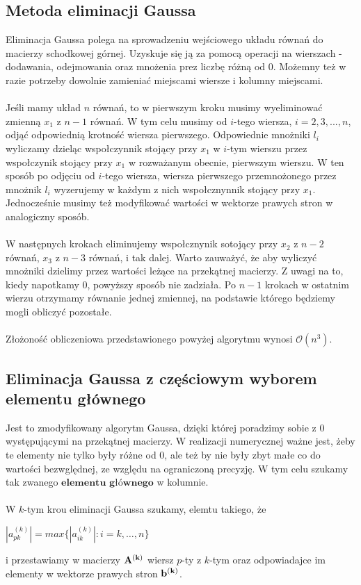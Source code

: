 \documentclass{article}
\begin{document}
\subsection{Metoda eliminacji Gaussa}
Eliminacja Gaussa polega na sprowadzeniu wejściowego układu równań do macierzy schodkowej górnej. Uzyskuje się ją za pomocą operacji na wierszach - dodawania, odejmowania oraz mnożenia prez  liczbę różną od 0. Możemny też w razie potrzeby dowolnie zamieniać miejscami wiersze i kolumny miejscami.
\\\\
Jeśli mamy układ $n$ równań, to w pierwszym kroku musimy wyeliminować zmienną $x_{1}$ z $n-1$ równań. W tym celu musimy od $i$-tego wiersza, $i = 2,3,...,n$, odjąć odpowiednią krotność wiersza pierwszego. Odpowiednie mnożniki $l_{i}$ wyliczamy dzieląc wspołczynnik stojący przy $x_{1}$ w $i$-tym wierszu przez wspołczynik stojący przy $x_{1}$ w rozważanym obecnie, pierwszym wierszu. W ten sposób po odjęciu od $i$-tego wiersza, wiersza pierwszego przemnożonego przez mnożnik $l_{i}$ wyzerujemy w każdym z nich wspołcznynnik stojący przy $x_{1}$. Jednocześnie musimy też modyfikować wartości w wektorze prawych stron w analogiczny sposób.
\\\\
W następnych krokach eliminujemy wspołcznynik sotojący przy $x_{2}$ z $n-2$ równań, $x_{3}$ z $n-3$ równań, i tak dalej. Warto zauważyć, że aby wyliczyć mnożniki dzielimy przez wartości leżące na przekątnej macierzy. Z uwagi na to, kiedy napotkamy 0, powyższy sposób nie zadziała. Po $n-1$ krokach w ostatnim wierzu otrzymamy równanie jednej zmiennej, na podstawie którego będziemy mogli obliczyć pozostałe.
\\\\
Złożoność obliczeniowa przedstawionego powyżej algorytmu wynosi $\mathcal{O}(n^{3})$.

\subsection{Eliminacja Gaussa z częściowym wyborem elementu głównego}
Jest to zmodyfikowany algorytm Gaussa, dzięki której poradzimy sobie z $0$
występującymi na przekątnej macierzy. W realizacji numerycznej ważne jest, żeby te elementy nie tylko były różne od $0$, ale też by nie były zbyt małe co do wartości bezwględnej, ze względu na ograniczoną precyzję. W tym celu szukamy tak zwanego $\mathbf{elementu}$ $\mathbf{głównego}$ w kolumnie.
\\\\
W $k$-tym krou eliminacji Gaussa szukamy, elemtu takiego, że
\begin{center}
     $|a_{pk}^{(k)}| = max \lbrace |a_{ik}^{(k)}| : i = k, \ldots, n  \rbrace$ 
\end{center}
i przestawiamy w macierzy $\bold{A^{(k)}}$ wiersz $p$-ty z $k$-tym oraz odpowiadajce im elementy w wektorze prawych stron $\bold{b^{(k)}}$.
\end{document}
